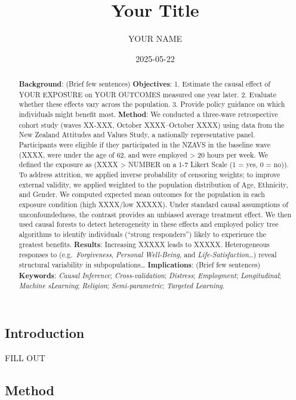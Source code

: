 \documentclass[
  single column]{article}
\title{Your Title}
\author{YOUR NAME}
\date{2025-05-22}
\begin{document}
\maketitle
\begin{abstract}
\textbf{Background}: (Brief few sentences) \textbf{Objectives}: 1.
Estimate the causal effect of YOUR EXPOSURE on YOUR OUTCOMES measured
one year later. 2. Evaluate whether these effects vary across the
population. 3. Provide policy guidance on which individuals might
benefit most. \textbf{Method}: We conducted a three-wave retrospective
cohort study (waves XX-XXX, October XXXX--October XXXX) using data from
the New Zealand Attitudes and Values Study, a nationally representative
panel. Participants were eligible if they participated in the NZAVS in
the baseline wave (XXXX, were under the age of 62, and were employed
\textgreater{} 20 hours per week. We defined the exposure as (XXXX
\textgreater{} NUMBER on a 1-7 Likert Scale (1 = yes, 0 = no)). To
address attrition, we applied inverse probability of censoring weights;
to improve external validity, we applied weighted to the population
distribution of Age, Ethnicity, and Gender. We computed expected mean
outcomes for the population in each exposure condition (high XXXX/low
XXXXX). Under standard causal assumptions of unconfoundedness, the
contrast provides an unbiased average treatment effect. We then used
causal forests to detect heterogeneity in these effects and employed
policy tree algorithms to identify individuals (``strong responders'')
likely to experience the greatest benefits. \textbf{Results}: Increasing
XXXXX leads to XXXXX. Heterogeneous responses to
(e.g.~\emph{Forgiveness}, \emph{Personal Well-Being}, and
\emph{Life-Satisfaction}\ldots) reveal structural variability in
subpopulations\ldots{} \textbf{Implications}: (Brief few sentences)
\textbf{Keywords}: \emph{Causal Inference}; \emph{Cross-validation};
\emph{Distress}; \emph{Employment}; \emph{Longitudinal}; \emph{Machine
sLearning}; \emph{Religion}; \emph{Semi-parametric}; \emph{Targeted
Learning}.
\end{abstract}


\newpage{}

\subsection{Introduction}\label{introduction}

FILL OUT

\subsection{Method}\label{method}
\end{document}
